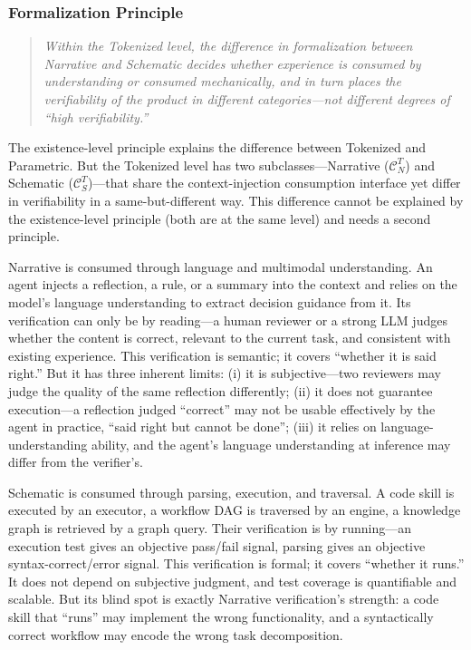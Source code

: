 \subsubsection{Formalization Principle}
\label{sec:formalization-principle}

\begin{quote}\itshape
Within the Tokenized level, the difference in formalization between Narrative and Schematic decides whether experience is consumed by understanding or consumed mechanically, and in turn places the verifiability of the product in different categories---not different degrees of ``high verifiability.''
\end{quote}

The existence-level principle explains the difference between Tokenized and Parametric. But the Tokenized level has two subclasses---Narrative ($\mathcal{C}^T_N$) and Schematic ($\mathcal{C}^T_S$)---that share the context-injection consumption interface yet differ in verifiability in a same-but-different way. This difference cannot be explained by the existence-level principle (both are at the same level) and needs a second principle.

Narrative is consumed through language and multimodal understanding. An agent injects a reflection, a rule, or a summary into the context and relies on the model's language understanding to extract decision guidance from it. Its verification can only be by reading---a human reviewer or a strong LLM judges whether the content is correct, relevant to the current task, and consistent with existing experience. This verification is semantic; it covers ``whether it is said right.'' But it has three inherent limits: (i) it is subjective---two reviewers may judge the quality of the same reflection differently; (ii) it does not guarantee execution---a reflection judged ``correct'' may not be usable effectively by the agent in practice, ``said right but cannot be done''; (iii) it relies on language-understanding ability, and the agent's language understanding at inference may differ from the verifier's.

Schematic is consumed through parsing, execution, and traversal. A code skill is executed by an executor, a workflow DAG is traversed by an engine, a knowledge graph is retrieved by a graph query. Their verification is by running---an execution test gives an objective pass/fail signal, parsing gives an objective syntax-correct/error signal. This verification is formal; it covers ``whether it runs.'' It does not depend on subjective judgment, and test coverage is quantifiable and scalable. But its blind spot is exactly Narrative verification's strength: a code skill that ``runs'' may implement the wrong functionality, and a syntactically correct workflow may encode the wrong task decomposition.

